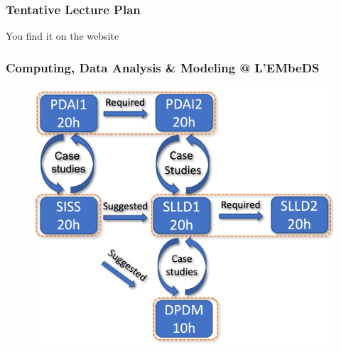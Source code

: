 \documentclass{beamer}%
\begin{document}
\begin{frame}
  \frametitle{Tentative Lecture Plan}
  \centering
  You find it on the website
  \\
  \myurl{\homepage}
\end{frame}

\begin{frame}
	\frametitle{Computing, Data Analysis \& Modeling @ L'EMbeDS}
	\centering
\begin{figure}
	\includegraphics[width=0.8\linewidth]{figures/compDataAnalModel.png}
\end{figure} 
\end{frame}



%  
\end{document}
